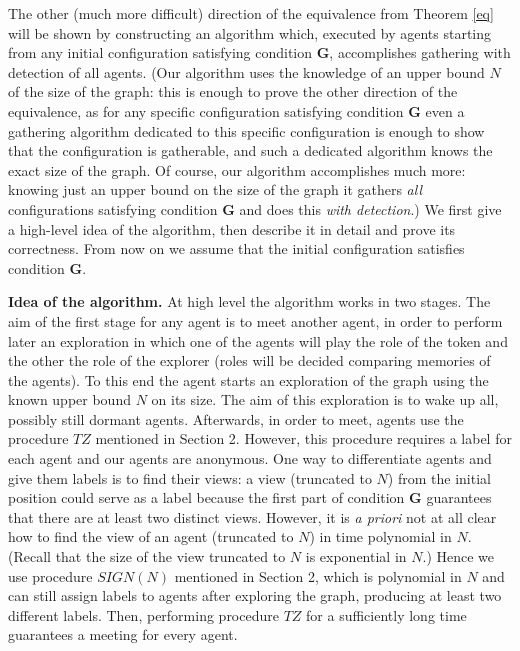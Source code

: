 \documentclass[11pt]{article}
\begin{document}
 The other (much more difficult) direction of the equivalence from Theorem \ref{eq} will be shown by constructing an algorithm which, 
 executed by agents starting from any initial
 configuration satisfying condition {\bf G}, accomplishes gathering with detection of all agents. (Our algorithm uses the knowledge of an upper bound $N$ of the size
 of the graph: this is enough to prove the other direction of the equivalence, as for any specific configuration satisfying condition {\bf G} even a gathering
 algorithm dedicated to this specific configuration is enough to show that the configuration is gatherable, and such a dedicated algorithm knows the exact size
 of the graph. Of course, our algorithm accomplishes much more: knowing just an upper bound on the size of the graph it gathers {\em all} configurations satisfying condition {\bf G} and does this {\em with detection}.) We first give a high-level idea of the algorithm, then describe
 it in detail and prove its correctness. From now on we assume that the initial configuration satisfies condition {\bf G}.
 
 \vspace*{0.3cm}
 \noindent
 {\bf Idea of the algorithm.}
 At high level the algorithm works in two stages. The aim of the first stage for any agent is to meet another agent, in order to perform later an exploration 
 in which one of the agents will play the role of the token and the other the role of the explorer (roles will be decided comparing memories of the agents).
 To this end the agent starts an exploration of the graph using the known upper bound $N$ on its size. The aim of this exploration is to wake up all, possibly still dormant
 agents. Afterwards,  in order to meet, 
 agents use the procedure $TZ$ mentioned in Section 2. 
 However, this procedure requires a label  for each agent and our agents are anonymous. One way to differentiate agents
 and give them labels is to find their views: a view (truncated to $N$) from the initial position could serve as a label because the first part of condition {\bf G} guarantees
 that there are at least two distinct views. However, it is {\em a priori} not at all clear how to find the view of an agent (truncated to $N$) in time polynomial in $N$.
 (Recall that the size of the view truncated to $N$ is exponential in $N$.) Hence we use
 procedure $SIGN(N)$ mentioned in Section 2, which is polynomial in $N$ and can still assign labels to agents {after exploring the graph}, producing at least two different labels. 
 Then, performing procedure $TZ$ for a sufficiently long time guarantees a meeting for every agent.
 
\end{document}
